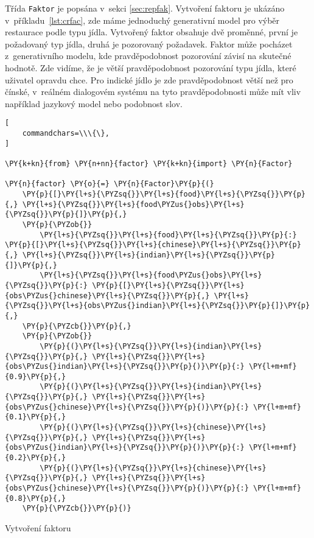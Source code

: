 Třída \texttt{Faktor} je popsána v~sekci \ref{sec:repfak}.
Vytvoření faktoru je ukázáno v~příkladu~\ref{lst:crfac}, zde máme jednoduchý generativní model pro výběr restaurace podle typu jídla.
Vytvořený faktor obsahuje dvě proměnné, první je požadovaný typ jídla, druhá je pozorovaný požadavek.
Faktor může pocházet z~generativního modelu, kde pravděpodobnost pozorování závisí na skutečné hodnotě.
Zde vidíme, že je větší pravděpodobnost pozorování typu jídla, které uživatel opravdu chce.
Pro indické jídlo je zde pravděpodobnost větší než pro čínské, v~reálném dialogovém systému na tyto pravděpodobnosti může mít vliv například jazykový model nebo podobnost slov.

\begin{example}
\begin{Verbatim}[
    commandchars=\\\{\},
]

\PY{k+kn}{from} \PY{n+nn}{factor} \PY{k+kn}{import} \PY{n}{Factor}

\PY{n}{factor} \PY{o}{=} \PY{n}{Factor}\PY{p}{(}
    \PY{p}{[}\PY{l+s}{\PYZsq{}}\PY{l+s}{food}\PY{l+s}{\PYZsq{}}\PY{p}{,} \PY{l+s}{\PYZsq{}}\PY{l+s}{food\PYZus{}obs}\PY{l+s}{\PYZsq{}}\PY{p}{]}\PY{p}{,}
    \PY{p}{\PYZob{}}
        \PY{l+s}{\PYZsq{}}\PY{l+s}{food}\PY{l+s}{\PYZsq{}}\PY{p}{:} \PY{p}{[}\PY{l+s}{\PYZsq{}}\PY{l+s}{chinese}\PY{l+s}{\PYZsq{}}\PY{p}{,} \PY{l+s}{\PYZsq{}}\PY{l+s}{indian}\PY{l+s}{\PYZsq{}}\PY{p}{]}\PY{p}{,}
        \PY{l+s}{\PYZsq{}}\PY{l+s}{food\PYZus{}obs}\PY{l+s}{\PYZsq{}}\PY{p}{:} \PY{p}{[}\PY{l+s}{\PYZsq{}}\PY{l+s}{obs\PYZus{}chinese}\PY{l+s}{\PYZsq{}}\PY{p}{,} \PY{l+s}{\PYZsq{}}\PY{l+s}{obs\PYZus{}indian}\PY{l+s}{\PYZsq{}}\PY{p}{]}\PY{p}{,}
    \PY{p}{\PYZcb{}}\PY{p}{,}
    \PY{p}{\PYZob{}}
		\PY{p}{(}\PY{l+s}{\PYZsq{}}\PY{l+s}{indian}\PY{l+s}{\PYZsq{}}\PY{p}{,} \PY{l+s}{\PYZsq{}}\PY{l+s}{obs\PYZus{}indian}\PY{l+s}{\PYZsq{}}\PY{p}{)}\PY{p}{:} \PY{l+m+mf}{0.9}\PY{p}{,}
		\PY{p}{(}\PY{l+s}{\PYZsq{}}\PY{l+s}{indian}\PY{l+s}{\PYZsq{}}\PY{p}{,} \PY{l+s}{\PYZsq{}}\PY{l+s}{obs\PYZus{}chinese}\PY{l+s}{\PYZsq{}}\PY{p}{)}\PY{p}{:} \PY{l+m+mf}{0.1}\PY{p}{,}
		\PY{p}{(}\PY{l+s}{\PYZsq{}}\PY{l+s}{chinese}\PY{l+s}{\PYZsq{}}\PY{p}{,} \PY{l+s}{\PYZsq{}}\PY{l+s}{obs\PYZus{}indian}\PY{l+s}{\PYZsq{}}\PY{p}{)}\PY{p}{:} \PY{l+m+mf}{0.2}\PY{p}{,}
		\PY{p}{(}\PY{l+s}{\PYZsq{}}\PY{l+s}{chinese}\PY{l+s}{\PYZsq{}}\PY{p}{,} \PY{l+s}{\PYZsq{}}\PY{l+s}{obs\PYZus{}chinese}\PY{l+s}{\PYZsq{}}\PY{p}{)}\PY{p}{:} \PY{l+m+mf}{0.8}\PY{p}{,}
    \PY{p}{\PYZcb{}}\PY{p}{)}
\end{Verbatim}
\caption{Vytvoření faktoru}
\label{lst:crfac}
\end{example}

